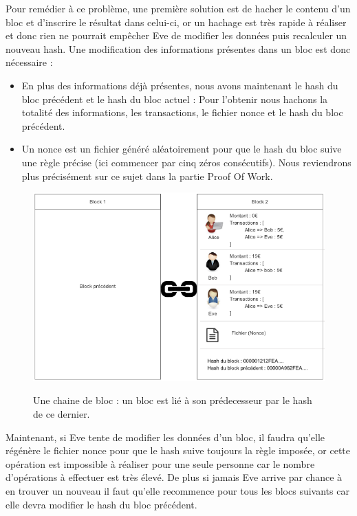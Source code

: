 \documentclass[12pt, a4paper, oneside]{book}
\begin{document}
    Pour remédier à ce problème, une première solution est de hacher le contenu d’un bloc et d’inscrire le résultat dans celui-ci, or un hachage est très rapide à réaliser et donc rien ne pourrait empêcher Eve de modifier les données puis recalculer un nouveau hash. Une modification des informations présentes dans un bloc est donc nécessaire :

    \begin{itemize}
        \item En plus des informations déjà présentes, nous avons maintenant le hash du bloc précédent et le hash du bloc actuel : Pour l’obtenir nous hachons la totalité des informations, les transactions, le fichier nonce et le hash du bloc précédent.
        \item Un nonce est un fichier généré aléatoirement pour que le hash du bloc suive une règle précise (ici commencer par cinq zéros consécutifs). Nous reviendrons plus précisément sur ce sujet dans la partie Proof Of Work.
    \end{itemize}

    \begin{figure}[H]
        \begin{center}
          \includegraphics[width=\textwidth]{images/chaine.png}
          \label{fig:chaine}
          \caption{Une chaine de bloc : un bloc est lié à son prédecesseur par le hash de ce dernier.}
        \end{center}
    \end{figure}

    Maintenant, si Eve tente de modifier les données d’un bloc, il faudra qu’elle régénère le fichier nonce pour que le hash suive toujours la règle imposée, or cette opération est impossible à réaliser pour une seule personne car le nombre d’opérations à effectuer est très élevé. De plus si jamais Eve arrive par chance à en trouver un nouveau il faut qu’elle recommence pour tous les blocs suivants car elle devra modifier le hash du bloc précédent.
\end{document}
